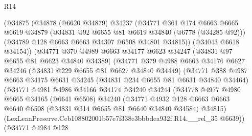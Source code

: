 \begin{lexlean}{R14}
\begin{coremodule}
                    (@34875
                      (@34878
                        (@6620 @34879)
                        @34237
                        (@34771
                          @361
                          @174
                          @6663
                          @6665
                          @6619
                          @34879
                          (@34831 @92 @6655 @81 @6619 @34840 (@6778 (@34285 @92)))
                          (@34789 @128 @6663 @6663 @34307 @6508 @34801 @34815))
                        (@34043 @6618 @34154))
                      (@34771
                        @370
                        @4989
                        @6663
                        @34177
                        @6623
                        @34247
                        (@34831 @97 @6655 @81 @6623 @34840 @34389)
                        (@34771
                          @379
                          @4988
                          @6663
                          @34176
                          @6627
                          @34246
                          (@34831 @229 @6655 @81 @6627 @34840 @34449)
                          (@34771
                            @388
                            @4987
                            @6663
                            @34175
                            @6631
                            @34245
                            (@34831 @234 @6655 @81 @6631 @34840 @34464)
                            (@34771
                              @4981
                              @4986
                              @34166
                              @34174
                              @34240
                              @34244
                              (@34778
                                @4977
                                @4980
                                @6665
                                @34165
                                (@6641 @6508)
                                @34240
                                (@34771
                                  @4932
                                  @128
                                  @6663
                                  @6663
                                  @6640
                                  @6508
                                  (@34831 @314 @6655 @81 @6640 @34840 @34584)
                                  @34815)
                                (LexLeanPreserve.Ceb108802001b57e7f338e3bbbdea932f.R14.__rel_35
                                  @6639))
                              (@34771
                                @4984
                                @128

\end{coremodule}
\end{lexlean}
